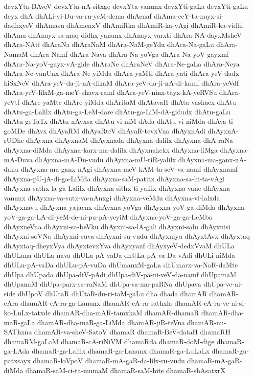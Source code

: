 {devxYta-BAveV
devxYta-nA-sitxge
devxYta-vanunx
devxYti-gaLa
devxYti-gaLu
deyx
dhA
dhALi-yi-Du-va-ru-yeM-dema
dhAcnaf
dhAma-ceY-ta-nayx-si-dadhxyeV
dhAmasu
dhAmenxV
dhAmiRka
dhAmiR-ka-vAgi
dhAmiR-ka-vidhi
dhAmu
dhAnayx-sa-maq-didhx-yanunx
dhAnayx-varxti
dhAra-NA-dayxMsheV
dhAra-NAtf
dhAraNa
dhAraNaM
dhAra-NaM-geYdu
dhAra-Na-gaLu
dhAra-NamaM
dhAra-Namf
dhAra-Nava
dhAra-Na-yoVga
dhAra-Na-yoV-gayxmf
dhAra-Na-yoV-gayx-vA-gide
dhAraNe
dhAraNeV
dhAra-Ne-gaLa
dhAra-Neya
dhAra-Ne-yanUnx
dhAra-Ne-yiMda
dhAra-yaMti
dhAra-yati
dhAra-yeV-dadx-kiSxNeV
dhAra-yeV-da-ji-nA-dikaM
dhAra-yeV-da-ji-nA-di-kamf
dhAra-yeVdf
dhAra-yeV-lilxM-ga-meY-shavx-ramf
dhAra-yeV-ninx-tayx-kA-yeRVSu
dhAra-yeVtf
dhAre-yaMte
dhAre-yiMda
dhAritaM
dhAtavaH
dhAta-vashacx
dhAtu
dhAtu-ga-Lalilx
dhAtu-ga-LeM-dare
dhAtu-ga-LiM-dA-gidudx
dhAtu-gaLu
dhAtu-geTaTx
dhAtu-nAyxsa
dhAtu-vi-niM-dAda
dhAtu-vi-niMda
dhAva-ti-goMDe
dhAvx
dhAyaRM
dhAyaRteV
dhAyaR-tevxVna
dhAyxnAdi
dhAyxnA-rUDhe
dhAyxna
dhAyxnaM
dhAyxnada
dhAyxna-dalilx
dhAyxna-dhA-raNa
dhAyxna-diMda
dhAyxna-karx-ma-dalilx
dhAyxnakekx
dhAyxna-liMga
dhAyxna-mA-Duva
dhAyxna-mA-Du-vudu
dhAyxna-mU-tiR-yalilx
dhAyxna-ma-ganx-nA-danu
dhAyxna-ma-ganx-nAgi
dhAyxna-meV-kAM-ta-seV-va-namf
dhAyxnamf
dhAyxna-pU-jA-di-ga-LiMda
dhAyxna-saM-patitx
dhAyxna-sa-hi-ta-vAgi
dhAyxna-sathx-la-ga-Lalilx
dhAyxna-sithx-ti-yalilx
dhAyxna-vane
dhAyxna-vanunx
dhAyxna-va-sutx-va-nAnxgi
dhAyxna-veMdu
dhAyxna-vi-lalxda
dhAyxnavu
dhAyxna-yajacnx
dhAyxna-yoVga
dhAyxna-yoV-ga-diMda
dhAyxna-yoV-ga-ga-LA-di-yeM-de-ni-pu-pA-yeyiM
dhAyxna-yoV-ga-ga-LeMba
dhAyxneVna
dhAyxni-sa-beVku
dhAyxni-sa-lA-gali
dhAyxni-salu
dhAyxnisi
dhAyxni-soVNa
dhAyxni-suva
dhAyxni-su-vudu
dhAyxniyu
dhAyxtAvx
dhAyxtaq
dhAyxtaq-dheyxVya
dhAyxtevxYva
dhAyxyanf
dhAyxyeV-dedxVvaM
dhULa
dhULana
dhULa-nava
dhULa-pA-vaDa
dhULa-pA-va-Da-vAdi
dhULi-niMda
dhULu-pA-vaDa
dhULu-pA-vuDa
dhUmanxM-gaLa
dhUmarx-va-NaR-daMte
dhUpa
dhUpada
dhUpa-diV-pAdi
dhUpa-diV-pa-ni-veV-da-namf
dhUpamaM
dhUpanaM
dhUpa-parx-sa-raNaM
dhUpa-sa-ma-paRNa
dhUpava
dhUpa-ve-ni-side
dhUpoV
dhUtaR
dhUtaR-du-ri-taM-gaLu
dha
dhada
dhamAR
dhamAR-cAra
dhamAR-cA-ra-ga-Lanunx
dhamAR-cA-ra-sathxla
dhamAR-cA-ra-ve-ni-si-ko-LuLx-tatxde
dhamAR-dha-mAR-tamxkaM
dhamAR-dhamaR
dhamAR-dha-maR-gaLa
dhamAR-dha-maR-ga-LiMda
dhamAR-jiR-teVna
dhamAR-nu-SAThxna
dhamAR-va-sheV-SatoV
dhamaR
dhamaR-BeV-dataH
dhamaRH
dhamaRM-gaLaM
dhamaR-cA-riNiVM
dhamaRda
dhamaR-doM-dige
dhamaR-ga-LAda
dhamaR-ga-Lalilx
dhamaR-ga-Lanunx
dhamaR-ga-LuLaLx
dhamaR-gu-patxsayx
dhamaR-loVpoV
dhamaR-mA-gaR-da-lilx-ru-vudu
dhamaR-mA-gaR-diMda
dhamaR-saM-ci-ta-mumaM
dhamaR-saM-hite
dhamaR-shAsatxrX
}
